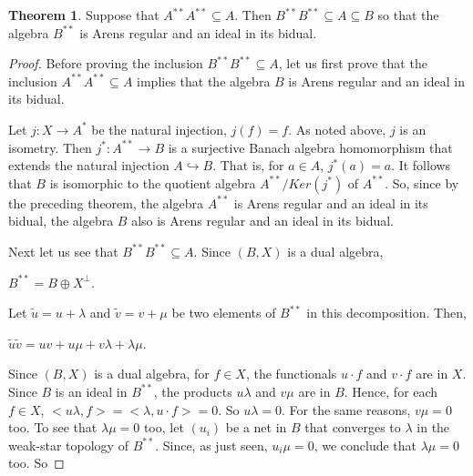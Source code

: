 \documentclass[12pt, twoside, leqno]{article}
\theoremstyle{definition}
\newtheorem{theorem}{Theorem}[section]
\theoremstyle{definition}
\numberwithin{equation}{section}
\begin{document}
\begin{theorem} Suppose that $ A^{**}A^{**}\subseteq A $. Then $ B^{**}B^{**}\subseteq A\subseteq B $ so that the algebra $ B^{**} $ is Arens regular and an ideal in its bidual.	
\end{theorem} 
\begin{proof}
	Before proving the inclusion $ B^{**}B^{**}\subseteq A $, let us first prove that the inclusion $ A^{**}A^{**}\subseteq A $ implies that the algebra $ B $ is Arens regular and an ideal in its bidual.\vspace{2mm}
	
	\noindent Let $ j:X\rightarrow A^{*} $ be the natural injection, $ j(f)=f $. As noted above, $ j $ is an isometry. Then $ j^{*}:A^{**}\rightarrow B $ is a surjective Banach algebra homomorphism that extends the natural injection $ A\hookrightarrow B $. That is, for $ a\in A $,  $ j^{*}(a)=a $. It follows that $ B $ is isomorphic to the quotient algebra $ A^{**}/Ker(j^{*}) $ of $ A^{**} $. So, since by the preceding theorem, the algebra $ A^{**} $ is Arens regular and an ideal in its bidual,  the algebra $ B $ also is Arens regular and an ideal in its bidual.\vspace{2mm}
	
	Next let us see that $ B^{**}B^{**}\subseteq A $. Since $ (B,X) $ is a dual algebra,\vspace{2mm}
	
	 $ B^{**}=B\oplus X^{\perp} $.\vspace{2mm}
	 
	 \noindent Let $ \tilde{u}=u+\lambda $ and $ \tilde{v}=v+\mu $ be two elements of $ B^{**} $ in this decomposition. Then, \vspace{3mm}
	
	$ \tilde{ u}\tilde{v}=uv+u\mu+v\lambda+\lambda \mu $.\vspace{3mm}
	
	\noindent Since $ (B,X) $ is a dual algebra,  for $ f\in X $, the functionals  $ u\cdot f$  and $v\cdot f$ are in $ X $. Since $ B $ is an ideal in $ B^{**} $, the products $ u\lambda $ and $ v\mu $ are in $ B $. Hence, for each $ f\in X $, $ <u\lambda,f>=<\lambda,u\cdot f>=0 $. So $ u\lambda=0$. For the same reasons, $v\mu=0 $ too. To see that $ \lambda\mu=0 $ too, let $ (u_{i}) $ be a net in $ B $ that converges to $ \lambda $ in the weak-star topology of $ B^{**} $. Since, as just seen, $ u_{i}\mu=0 $, we conclude that $ \lambda\mu=0 $ too. So\vspace{2mm}
	

\end{proof}
\end{document}
